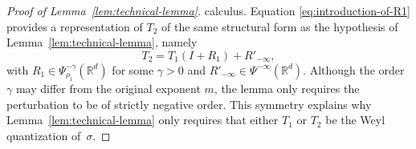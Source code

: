 \documentclass[a4paper,12pt]{article}
\newcommand{\R}{\mathbb{R}}
\begin{document}
\begin{proof}[Proof of Lemma~\ref{lem:technical-lemma}]
calculus. Equation \eqref{eq:introduction-of-R1} provides a representation of $T_2$
of the same structural form as the hypothesis of
Lemma~\ref{lem:technical-lemma}, namely
\[
T_2 = T_1 (I+R_1) + R'_{-\infty},
\]
with $R_1\in\Psi^{-\gamma}_{\rho_1}(\R^d)$ for some $\gamma>0$ and
$R'_{-\infty}\in\Psi^{-\infty}(\R^d)$.
Although the order $\gamma$ may differ from the original exponent $m$,
the lemma only requires the perturbation to be of strictly negative order.
This symmetry explains why Lemma~\ref{lem:technical-lemma} only requires that
either $T_1$ or $T_2$ be the Weyl quantization of~$\sigma$.




    


\end{proof}
\end{document}
